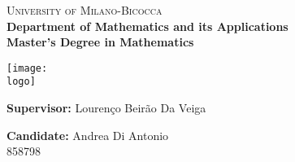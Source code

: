 
\begin{titlepage}

    \afterpage{\restoregeometry}

    \thispagestyle{fancy}
    \fancyhf{}
    
    \begin{minipage}[t]{1\textwidth}
        \centering
        \huge{\textsc{University of Milano-Bicocca}} \\
        \large{\textbf{Department of Mathematics and its Applications}} \\
        \large{\textbf{Master's Degree in Mathematics}} \\
    \end{minipage}
    
    \vspace{6.25mm}
        
    \begin{minipage}[t]{1\textwidth}
        \centering
        \texttt{[image: \\logo]}
    \end{minipage}
    
    \vspace{6.25mm}
    
    \begin{center}
        \huge{\textbf{\brokendocumenttitle}}

        \vspace{1.5mm} 

        \Large{\textit{\documentsubtitle}}
    \end{center}
    
    \vspace{15mm}

    \begin{flushleft}
        \noindent \large{\textbf{Supervisor:} Lourenço Beirão Da Veiga}
    \end{flushleft}
    
    \vspace{5mm}

    \begin{flushright}
        \large{ \textbf{Candidate:} Andrea Di Antonio \\ 858798}
    \end{flushright}

    \vspace{15mm}

    \begin{center}
        \large{\textbf{\documentdate}}
    \end{center}

\end{titlepage}